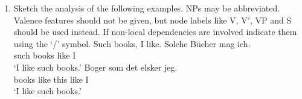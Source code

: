 {\begin{enumerate}
\eal
\ex
\gll Arbejder Bjarne ihærdigt  på bogen?\\
     works    Bjarne seriously at book.\textsc{def}\\
\glt `Does Bjarne work seriously on the book?'
\ex
\gll Arbeitet Bjarne ernsthaft an dem Buch?\\
     works    Bjarne seriously at the book\\\german
\glt `Does Bjarne work seriously on the book?'
\zl

\item Sketch the analysis of the following examples. NPs may be abbreviated. Valence features should
  not be given, but node labels like V, V$'$, VP and S should be used instead. If non-local
  dependencies are involved indicate them using the `/' symbol.
\eal
\ex Such books, I like.
\ex 
\gll Solche Bücher mag ich.\\
     such   books  like I\\\german
\glt `I like such books.'
\ex
\gll Boger som det elsker jeg.\\
     books like this like I\\\danish
\glt `I like such books.'
\zl

\end{enumerate}

}


